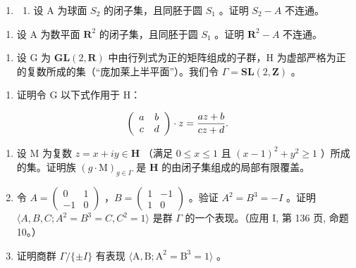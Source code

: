 \begin{enumerate}
\def\labelenumi{\arabic{enumi})}
\setcounter{enumi}{3}
\tightlist
\item
  \begin{enumerate}
  \def\labelenumii{\alph{enumii})}
  \tightlist
  \item
    设 A 为球面 \(S_{2}\) 的闭子集，且同胚于圆 \(S_{1}\) 。证明 \(S_{2}-A\) 不连通。
  \end{enumerate}
\end{enumerate}

\begin{enumerate}
\def\labelenumi{\alph{enumi})}
\setcounter{enumi}{1}
\tightlist
\item
  设 A 为数平面 \(\mathbf{R}^{2}\) 的闭子集，且同胚于圆 \(S_{1}\) 。证明 \(\mathbf{R}^{2}-A\) 不连通。
\end{enumerate}

\begin{enumerate}
\def\labelenumi{\arabic{enumi})}
\setcounter{enumi}{4}
\tightlist
\item
  设 G 为 \(\mathbf{GL}(2,\mathbf{R})\) 中由行列式为正的矩阵组成的子群，H 为虚部严格为正的复数所成的集（“庞加莱上半平面”）。我们令 \(\Gamma = \mathbf{SL}(2,\mathbf{Z})\) 。
\end{enumerate}

\begin{enumerate}
\def\labelenumi{\alph{enumi})}
\tightlist
\item
  证明令 G 以下式作用于 H：
\end{enumerate}

\[
\left( \begin{array}{c c} a & b \\ c & d \end{array} \right) \cdot z = \frac {a z + b}{c z + d}.
\]

\begin{enumerate}
\def\labelenumi{\alph{enumi})}
\setcounter{enumi}{1}
\item
  设 M 为复数 \(z = x + iy \in \mathbf{H}\) （满足 \(0 \leqslant x \leqslant 1\) 且 \((x - 1)^2 + y^2 \geqslant 1\) ）所成的集。证明族 \((g \cdot \mathrm{M})_{g \in \Gamma}\) 是 \(\mathbf{H}\) 的由闭子集组成的局部有限覆盖。
\item
  令 \(A = \begin{pmatrix} 0 & 1 \\ -1 & 0 \end{pmatrix}\) ，\(B = \begin{pmatrix} 1 & -1 \\ 1 & 0 \end{pmatrix}\) 。验证 \(A^{2} = B^{3} = -I\) 。证明 \(\langle A, B, C; A^{2} = B^{3} = C, C^{2} = 1 \rangle\) 是群 \(\Gamma\) 的一个表现。（应用 I, 第 136 页, 命题 10。）
\item
  证明商群 \(\Gamma/\{\pm I\}\) 有表现 \(\langle\mathrm{A},\mathrm{B};\mathrm{A}^{2}=\mathrm{B}^{3}=1\rangle\) 。
\end{enumerate}

